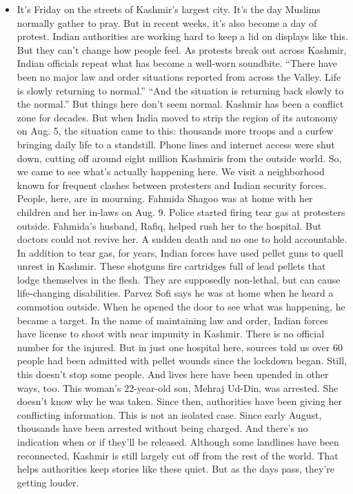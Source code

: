 \begin{itemize}
\tightlist
\item
  It's Friday on the streets of Kashmir's largest city. It's the day
  Muslims normally gather to pray. But in recent weeks, it's also become
  a day of protest. Indian authorities are working hard to keep a lid on
  displays like this. But they can't change how people feel. As protests
  break out across Kashmir, Indian officials repeat what has become a
  well-worn soundbite. ``There have been no major law and order
  situations reported from across the Valley. Life is slowly returning
  to normal.'' ``And the situation is returning back slowly to the
  normal.'' But things here don't seem normal. Kashmir has been a
  conflict zone for decades. But when India moved to strip the region of
  its autonomy on Aug. 5, the situation came to this: thousands more
  troops and a curfew bringing daily life to a standstill. Phone lines
  and internet access were shut down, cutting off around eight million
  Kashmiris from the outside world. So, we came to see what's actually
  happening here. We visit a neighborhood known for frequent clashes
  between protesters and Indian security forces. People, here, are in
  mourning. Fahmida Shagoo was at home with her children and her in-laws
  on Aug. 9. Police started firing tear gas at protesters outside.
  Fahmida's husband, Rafiq, helped rush her to the hospital. But doctors
  could not revive her. A sudden death and no one to hold accountable.
  In addition to tear gas, for years, Indian forces have used pellet
  guns to quell unrest in Kashmir. These shotguns fire cartridges full
  of lead pellets that lodge themselves in the flesh. They are
  supposedly non-lethal, but can cause life-changing disabilities.
  Parvez Sofi says he was at home when he heard a commotion outside.
  When he opened the door to see what was happening, he became a target.
  In the name of maintaining law and order, Indian forces have license
  to shoot with near impunity in Kashmir. There is no official number
  for the injured. But in just one hospital here, sources told us over
  60 people had been admitted with pellet wounds since the lockdown
  began. Still, this doesn't stop some people. And lives here have been
  upended in other ways, too. This woman's 22-year-old son, Mehraj
  Ud-Din, was arrested. She doesn't know why he was taken. Since then,
  authorities have been giving her conflicting information. This is not
  an isolated case. Since early August, thousands have been arrested
  without being charged. And there's no indication when or if they'll be
  released. Although some landlines have been reconnected, Kashmir is
  still largely cut off from the rest of the world. That helps
  authorities keep stories like these quiet. But as the days pass,
  they're getting louder.
\end{itemize}

